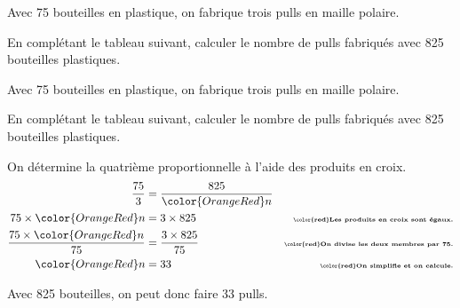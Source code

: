\begin{exercice*}
    Avec \num{75} bouteilles en plastique, on fabrique trois pulls en maille polaire.\par
    En complétant le tableau suivant, calculer le nombre de pulls fabriqués avec 825 bouteilles plastiques.
    \begin{center}
        \Propor[Math,Stretch=1.2,GrandeurA=Nombre de bouteilles,GrandeurB=Nombre de pulls,CouleurTab=LightGray]{/,/\textcolor{OrangeRed}{$n$ ?}}        
    \end{center}
\end{exercice*}
\begin{corrige}
    Avec \num{75} bouteilles en plastique, on fabrique trois pulls en maille polaire.\par
    En complétant le tableau suivant, calculer le nombre de pulls fabriqués avec 825 bouteilles plastiques.
    \begin{center}
        \Propor[Math,Stretch=1.2,GrandeurA=Nombre de bouteilles,GrandeurB=Nombre de pulls,CouleurTab=LightGray]{\textcolor{red}{$75$}/\textcolor{red}{$3$},\textcolor{red}{$825$}/\textcolor{OrangeRed}{$n$ ?}}        
    \end{center}
    {\color{red}
    On détermine la quatrième proportionnelle à l'aide des produits en croix.
        \begin{align*}
            \dfrac{75}{3}                             &=\dfrac{825}{\color{OrangeRed} n}&\\
            75\times {\color{OrangeRed} n}            &= 3\times 825                    &\text{\tiny\bfseries\color{red}Les produits en croix sont égaux.}\\
            \dfrac{75\times {\color{OrangeRed} n}}{75}&= \dfrac{3\times 825}{75}        &\text{\tiny\bfseries\color{red}On divise les deux membres par 75.}\\
            {\color{OrangeRed} n}                     &=33                              &\text{\tiny\bfseries\color{red}On simplifie et on calcule.}
        \end{align*}
        \par\smallskip
        Avec 825 bouteilles, on peut donc faire 33 pulls.
    }
\end{corrige}

